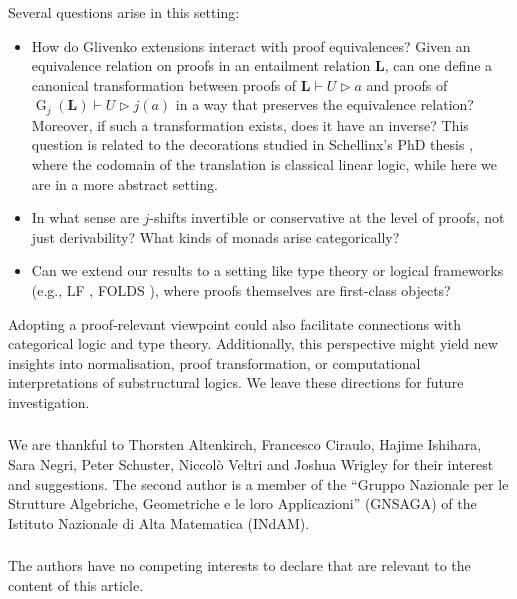 \documentclass[runningheads]{llncs}
\renewcommand{\L}{\mathbf{L}}
\DeclareMathOperator{\Glivenko}{G}
\begin{document}
Several questions arise in this setting:
\begin{itemize}
	\item How do Glivenko extensions interact with proof equivalences? Given an equivalence relation on proofs in an entailment relation $\L$, can one define a canonical transformation between proofs of $\L \vdash U \rhd a$ and proofs of $\Glivenko_j(\L) \vdash U \rhd j(a)$ in a way that preserves the equivalence relation? Moreover, if such a transformation exists, does it have an inverse? This question is related to the decorations studied in Schellinx's PhD thesis \cite{schellinx1994noble}, where the codomain of the translation is classical linear logic, while here we are in a more abstract setting.
	\item In what sense are $j$-shifts invertible or conservative at the level of proofs, not just derivability? What kinds of monads arise categorically?
	\item Can we extend our results to a setting like type theory or logical frameworks (e.g., LF \cite{HarperLF87}, FOLDS \cite{makkai1998towards}), where proofs themselves are first-class objects?
\end{itemize}

Adopting a proof-relevant viewpoint could also facilitate connections with categorical logic and type theory. Additionally, this perspective might yield new insights into normalisation, proof transformation, or computational interpretations of substructural logics.
We leave these directions for future investigation.


\begin{credits}
\subsubsection{\ackname} We are thankful to Thorsten Altenkirch, Francesco Ciraulo, Hajime Ishihara, Sara Negri, Peter Schuster, Niccolò Veltri and Joshua Wrigley for their interest and suggestions.
The second author is a member of the ``Gruppo Nazionale per le Strutture Algebriche, Geometriche e le loro Applicazioni''  (GNSAGA) of the Istituto Nazionale di Alta Matematica (INdAM).

\subsubsection{\discintname}
The authors have no competing interests to declare that are relevant to the content of this article.
\end{credits}
%
%
%


%
\end{document}
